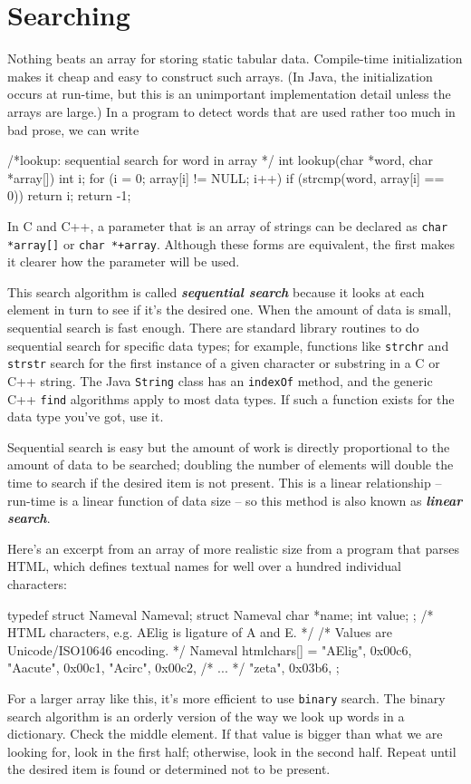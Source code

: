\section{Searching}
Nothing beats an array for storing static tabular data. Compile-time
initialization makes it cheap and easy to construct such arrays. (In Java,
the initialization occurs at run-time, but this is an unimportant
implementation detail unless the arrays are large.) In a program to detect
words that are used rather too much in bad prose, we can write
\begin{wellcode}
    /*lookup: sequential search for word in array */
    int lookup(char *word, char *array[])
    {
        int i;
        for (i = 0; array[i] != NULL; i++)
           if (strcmp(word, array[i] == 0))
                return i;
        return -1;
    }
\end{wellcode}
In C and C++, a parameter that is an array of strings can be declared as
\verb"char *array[]" or \verb"char *+array". Although these forms are
equivalent, the first makes it clearer how the parameter will be used.

This search algorithm is called \textbf{\textit{sequential search}} because
it looks at each element in turn to see if it's the desired one. When the
amount of data is small, sequential search is fast enough. There are
standard library routines to do sequential search for specific data types;
for example, functions like \texttt{strchr} and \texttt{strstr} search for
the first instance of a given character or substring in a C or C++ string.
The Java \verb'String' class has an \verb'indexOf' method, and the generic
C++ \verb'find' algorithms apply to most data types. If such a function
exists for the data type you've got, use it.

Sequential search is easy but the amount of work is directly proportional
to the amount of data to be searched; doubling the number of elements will
double the time to search if the desired item is not present. This is a
linear relationship -- run-time is a linear function of data size -- so
this method is also known as \textbf{\textit{linear search}}.


Here's an excerpt from an array of more realistic size from a program that
parses HTML, which defines textual names for well over a hundred individual
characters:
\begin{wellcode}
    typedef struct Nameval Nameval;
    struct Nameval{
        char *name;
        int value;
    };
    /* HTML characters, e.g. AElig is ligature of A and E. */
    /* Values are Unicode/ISO10646 encoding. */
    Nameval htmlchars[] = {
        "AElig",    0x00c6,
        "Aacute",   0x00c1,
        "Acirc",    0x00c2,
        /* ... */
        "zeta",     0x03b6,
    };
\end{wellcode}
For a larger array like this, it's more efficient to use
\verb'binary' search. The binary search algorithm is an orderly
version of the way we look up words in a dictionary. Check the middle
element. If that value is bigger than what we are looking for, look in the
first half; otherwise, look in the second half. Repeat until the desired
item is found or determined not to be present.

